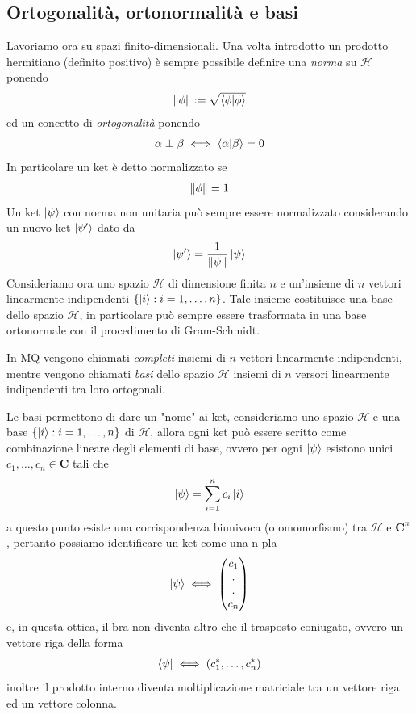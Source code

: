 \documentclass{article}
\begin{document}
\subsection{Ortogonalità, ortonormalità e basi}
Lavoriamo ora su spazi finito-dimensionali. Una volta introdotto un prodotto hermitiano (definito positivo) è sempre possibile definire una \textit{norma} su $\mathcal{H}$ ponendo
\begin{gather}
    \|\phi\| := \sqrt{\braket{\phi|\phi}} \notag
\end{gather}
ed un concetto di \textit{ortogonalità} ponendo
\begin{gather}
    \alpha \perp \beta \iff \braket{\alpha|\beta} = 0 \notag
\end{gather}
In particolare un ket è detto normalizzato se
\begin{gather}
    \|\phi\| = 1 \notag
\end{gather}
Un ket $\ket{\psi}$ con norma non unitaria può sempre essere normalizzato considerando un nuovo ket $\ket{\psi'}$ dato da
\begin{gather}
    \ket{\psi'} = \frac{1}{\|\psi\|}\ket{\psi} \notag
\end{gather}
Consideriamo ora uno spazio $\mathcal{H}$ di dimensione finita $n$ e un'insieme di $n$ vettori linearmente indipendenti $\{ \ket{{i}} : i = 1, \dots, n \}$. Tale insieme costituisce una base dello spazio $\mathcal{H}$, in particolare può sempre essere trasformata in una base ortonormale con il procedimento di Gram-Schmidt. 

In MQ vengono chiamati \textit{completi} insiemi di $n$ vettori linearmente indipendenti, mentre vengono chiamati \textit{basi} dello spazio $\mathcal{H}$ insiemi di $n$ versori linearmente indipendenti tra loro ortogonali.

Le basi permettono di dare un "nome" ai ket, consideriamo uno spazio $\mathcal{H}$ e una base $\{ \ket{i} : i = 1, \dots, n \}$ di $\mathcal{H}$, allora ogni ket può essere scritto come combinazione lineare degli elementi di base, ovvero per ogni $\ket{\psi}$ esistono unici $c_1, \dots, c_n \in \mathbf{C}$ tali che
\begin{gather}
    \ket{\psi} = \sum_{i = 1}^n c_i\ket{i} \notag
\end{gather}
a questo punto esiste una corrispondenza biunivoca (o omomorfismo) tra $\mathcal{H}$ e $\mathbf{C}^n$, pertanto possiamo identificare un ket come una n-pla
\begin{gather}
    \ket{\psi} \iff \begin{pmatrix}
        c_1 \\
        . \\
        . \\
        c_n
    \end{pmatrix} \notag
\end{gather}
e, in questa ottica, il bra non diventa altro che il trasposto coniugato, ovvero un vettore riga della forma
\begin{gather}
    \bra{\psi} \iff (c_1^*, \dots, c_n^*) \notag
\end{gather}
inoltre il prodotto interno diventa moltiplicazione matriciale tra un vettore riga ed un vettore colonna.
\end{document}
